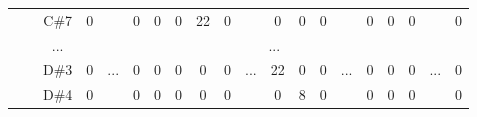 \documentclass[12pt]{article}
\begin{document}
\begin{table}[H]
{\begin{tabular}{clcccccccccccccccccc}
					   & \multicolumn{1}{l|}{} & \multicolumn{1}{c|}{C\#7} & \multicolumn{1}{c|}{0}    & \multicolumn{1}{c|}{}                     & \multicolumn{1}{c|}{0}    & \multicolumn{1}{c|}{0}    & \multicolumn{1}{c|}{0}    & \multicolumn{1}{c|}{22}   & \multicolumn{1}{c|}{0}  & \multicolumn{1}{c|}{}                     & \multicolumn{1}{c|}{0}    & \multicolumn{1}{c|}{0}    & \multicolumn{1}{c|}{0}    & \multicolumn{1}{c|}{}                     & \multicolumn{1}{c|}{0}  & \multicolumn{1}{c|}{0}  & \multicolumn{1}{c|}{0}  & \multicolumn{1}{c|}{}                     & \multicolumn{1}{c|}{0}  \\ \cline{3-4} \cline{6-10} \cline{12-14} \cline{16-18} \cline{20-20} 
					   & \multicolumn{1}{l|}{} & \multicolumn{1}{c|}{...}  & \multicolumn{17}{c|}{...}                                                                                                                                                                                                                                                                                                                                                                                                                                                                                                                       \\ \cline{3-4} \cline{6-10} \cline{12-14} \cline{16-18} \cline{20-20} 
					   & \multicolumn{1}{l|}{} & \multicolumn{1}{c|}{D\#3} & \multicolumn{1}{c|}{0}    & \multicolumn{1}{c|}{...}                  & \multicolumn{1}{c|}{0}    & \multicolumn{1}{c|}{0}    & \multicolumn{1}{c|}{0}    & \multicolumn{1}{c|}{0}    & \multicolumn{1}{c|}{0}  & \multicolumn{1}{c|}{...}                  & \multicolumn{1}{c|}{22}   & \multicolumn{1}{c|}{0}    & \multicolumn{1}{c|}{0}    & \multicolumn{1}{c|}{...}                  & \multicolumn{1}{c|}{0}  & \multicolumn{1}{c|}{0}  & \multicolumn{1}{c|}{0}  & \multicolumn{1}{c|}{...}                  & \multicolumn{1}{c|}{0}  \\ \cline{3-4} \cline{6-10} \cline{12-14} \cline{16-18} \cline{20-20} 
					   & \multicolumn{1}{l|}{} & \multicolumn{1}{c|}{D\#4} & \multicolumn{1}{c|}{0}    & \multicolumn{1}{c|}{}                     & \multicolumn{1}{c|}{0}    & \multicolumn{1}{c|}{0}    & \multicolumn{1}{c|}{0}    & \multicolumn{1}{c|}{0}    & \multicolumn{1}{c|}{0}  & \multicolumn{1}{c|}{}                     & \multicolumn{1}{c|}{0}    & \multicolumn{1}{c|}{8}    & \multicolumn{1}{c|}{0}    & \multicolumn{1}{c|}{}                     & \multicolumn{1}{c|}{0}  & \multicolumn{1}{c|}{0}  & \multicolumn{1}{c|}{0}  & \multicolumn{1}{c|}{}                     & \multicolumn{1}{c|}{0}  \\ \cline{3-4} \cline{6-10} \cline{12-14} \cline{16-18} \cline{20-20} 

\end{tabular}}
\end{table}
\end{document}
